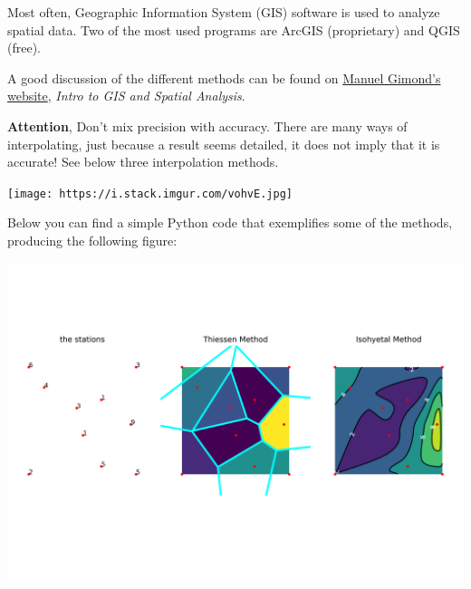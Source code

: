 \documentclass[
  letterpaper,
  DIV=11,
  numbers=noendperiod]{scrreprt}
\begin{document}
Most often, Geographic Information System (GIS) software is used to
analyze spatial data. Two of the most used programs are ArcGIS
(proprietary) and QGIS (free).

A good discussion of the different methods can be found on
\href{https://mgimond.github.io/Spatial/spatial-interpolation.html}{Manuel
Gimond's website}, \emph{Intro to GIS and Spatial Analysis}.

\textbf{Attention}, Don't mix precision with accuracy. There are many
ways of interpolating, just because a result seems detailed, it does not
imply that it is accurate! See below three interpolation methods.

\texttt{[image: https://i.stack.imgur.com/vohvE.jpg]}

Below you can find a simple Python code that exemplifies some of the
methods, producing the following figure:

\includegraphics{archive/figures/spatial-distribution.png}
\end{document}

